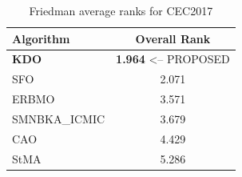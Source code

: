 \begin{table}[H]
\centering\small
\caption{Friedman average ranks for CEC2017}
\label{tab:cec2017_friedman}
\begin{tabular}{lc}
\toprule
\textbf{Algorithm} & \textbf{Overall Rank} \\
\midrule
\textbf{KDO} & \textbf{1.964}  <-- PROPOSED \\
SFO & 2.071 \\
ERBMO & 3.571 \\
SMNBKA_ICMIC & 3.679 \\
CAO & 4.429 \\
StMA & 5.286 \\
\bottomrule
\end{tabular}
\end{table}
